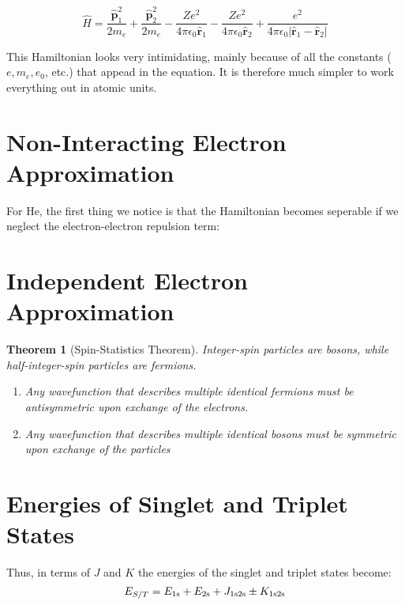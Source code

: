 \documentclass[a4paper]{tufte-handout}
\newtheorem{theorem}{Theorem}
\theoremstyle{definition}
\begin{document}
\begin{equation}
  \hat{H} = \frac{\hat{\mathbf{p}}_1^2}{2m_e} + \frac{\hat{\mathbf{p}}_2^2}{2m_e} - \frac{Ze^2}{4\pi\epsilon_0 \hat{\mathbf{r}}_1} - \frac{Ze^2}{4\pi\epsilon_0 \hat{\mathbf{r}}_2} + \frac{e^2}{4\pi\epsilon_0 | \hat{\mathbf{r}}_1 - \hat{\mathbf{r}}_2|}
\end{equation} 

This Hamiltonian looks very intimidating, mainly because of all the constants ($e, m_e, e_0$, etc.) that appead in the equation. It is therefore
much simpler to work everything out in atomic units.

\section{Non-Interacting Electron Approximation}

For He, the first thing we notice is that the Hamiltonian becomes seperable if we neglect the
electron-electron repulsion term:

\section{Independent Electron Approximation}

\begin{theorem}[Spin-Statistics Theorem] Integer-spin particles are bosons, while half-integer-spin particles are fermions.
  \begin{enumerate}
    \item Any wavefunction that describes multiple identical fermions must be antisymmetric upon exchange of the electrons.
    \item Any wavefunction that describes multiple identical bosons must be symmetric upon exchange of the particles
  \end{enumerate}
   
\end{theorem}

\section{Energies of Singlet and Triplet States}

Thus, in terms of $J$ and $K$ the energies of the singlet and triplet states become:
\begin{equation*}
  E_{S/T} = E_{1\ce{s}} + E_{2\ce{s}} + J_{1\ce{s}2\ce{s}} \pm  K_{1\ce{s}2\ce{s}}
\end{equation*}
\end{document}
